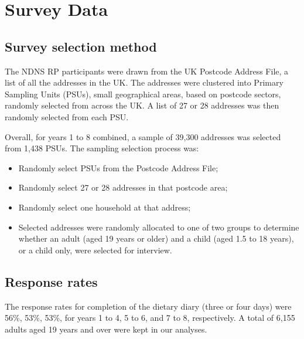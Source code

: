 
\section{Survey Data}\vspace{-0.3cm}

\subsection{Survey selection method}\vspace{-0.3cm}

The NDNS RP participants were drawn from the UK Postcode Address File, a list of all the addresses in the UK. The addresses were clustered into Primary Sampling Units (PSUs), small geographical areas, based on postcode sectors, randomly selected from across the UK. A list of 27 or 28 addresses was then randomly selected from each PSU.

Overall, for years 1 to 8 combined, a sample of 39,300 addresses was selected from 1,438 PSUs. The sampling selection process was: 

\begin{itemize}
	\item Randomly select PSUs from the Postcode Address File; 
	\item Randomly select 27 or 28 addresses in that postcode area; 
	\item Randomly select one household at that address; 
	\item Selected addresses were randomly allocated to one of two groups to determine whether an adult (aged 19 years or older) and a child (aged 1.5 to 18 years), or a child only, were selected for interview.
\end{itemize}
\vspace{-0.6cm}
\subsection{Response rates}\vspace{-0.3cm}

The response rates for completion of the dietary diary (three or four days) were 56\%, 53\%, 53\%, for years 1 to 4, 5 to 6, and 7 to 8, respectively. A total of 6,155 adults aged 19 years and over were kept in our analyses. 
\vspace{-0.6cm}


